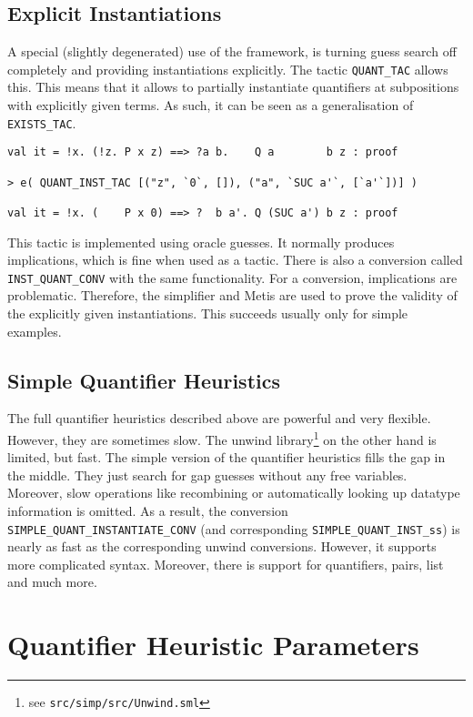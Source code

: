 \documentclass[a4paper,12pt,DIV=12,oneside]{scrbook}
\theoremstyle{definition}
\theoremstyle{remark}
\begin{document}
\subsection{Explicit Instantiations}

A special (slightly degenerated) use of the framework, is turning guess search off completely and
providing instantiations explicitly. The tactic \texttt{QUANT\_TAC} allows this. This means that
it allows to partially instantiate quantifiers at subpositions
with explicitly given terms. As such, it can be seen as
a generalisation of \texttt{EXISTS\_TAC}.
%
{\scriptsize
\begin{verbatim}
val it = !x. (!z. P x z) ==> ?a b.    Q a        b z : proof

> e( QUANT_INST_TAC [("z", `0`, []), ("a", `SUC a'`, [`a'`])] )

val it = !x. (    P x 0) ==> ?  b a'. Q (SUC a') b z : proof
\end{verbatim}}
%
This tactic is implemented using oracle guesses. It normally
produces implications, which is fine when used as a tactic. There is
also a conversion called \texttt{INST\_QUANT\_CONV} with the same
functionality. For a conversion, implications are
problematic. Therefore, the simplifier and Metis are used to prove
the validity of the explicitly given instantiations. This succeeds
usually only for simple examples.


\subsection{Simple Quantifier Heuristics}\label{subsec_simple}

The full quantifier heuristics described above are powerful and very flexible.
However, they are sometimes slow.
The unwind library\footnote{see \texttt{src/simp/src/Unwind.sml}} on the other hand is limited, but fast.
The simple version of the quantifier heuristics fills the gap in the middle.
They just search for gap guesses without any free variables.
Moreover, slow operations like recombining or automatically looking up datatype information is omitted.
As a result, the conversion \texttt{SIMPLE\_QUANT\_INSTANTIATE\_CONV} (and corresponding \texttt{SIMPLE\_QUANT\_INST\_ss}) is nearly as fast as the corresponding unwind conversions.
However, it supports more complicated syntax. Moreover, there is support for quantifiers, pairs, list and much more.

\section{Quantifier Heuristic Parameters}\label{sec_qps}
\end{document}
